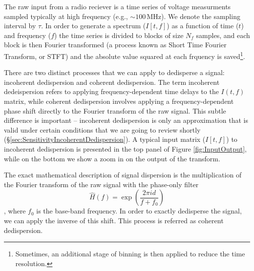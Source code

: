 \documentclass[iop]{emulateapj}
\begin{document}
The raw input from a radio reciever is a time series of voltage measurments
sampled typically at high frequency (e.g., $\sim 100$\,MHz).
We denote the sampling interval by $\tau$.
%
In order to generate a spectrum ($I[t,f]$) as a function of time ($t$) and frequency ($f$) the time series is
divided to blocks of size $N_{f}$ samples, and each block is then Fourier transformed
(a process known as Short Time Fourier Transform, or STFT)
and the absolute value squared at each frquency is saved\footnote{Sometimes, an additional stage of binning is then applied to reduce the time resolution.}.

There are two distinct processes that we can apply to dedisperse a signal: incoherent dedispersion and coherent dedispersion.
The term incoherent dedeispersion refers to applying frequency-dependent time delays to the $I(t,f)$ matrix,
while coherent dedispersion involves applying a frequency-dependent phase shift directly to the Fourier transform of the raw signal.
%
This subtle difference is important -- incoherent dedispersion is only an approximation that is valid
under certain conditions that we are going to review shortly (\S\ref{sec:SensitivityIncoherentDedispersion}).
A typical input matrix ($I[t,f]$) to incoherent dedispersion is presented in the top panel of Figure \ref{fig:InputOutput}, while on the bottom we show a zoom in on the output of the transform.
 
The exact mathematical description of signal dispersion is the multiplication of the Fourier transform of the raw signal with the phase-only filter \begin{equation}\hat{H}(f) = \exp{\left(\frac{2\pi id}{f+f_0}\right)}\end{equation}  \citep{HandbookOfPulsarAstronomy}
, where $f_0$ is the base-band frequency.
In order to exactly dedisperse the signal, we can apply the inverse of this shift. This process is referred as coherent dedispersion. 
\end{document}
